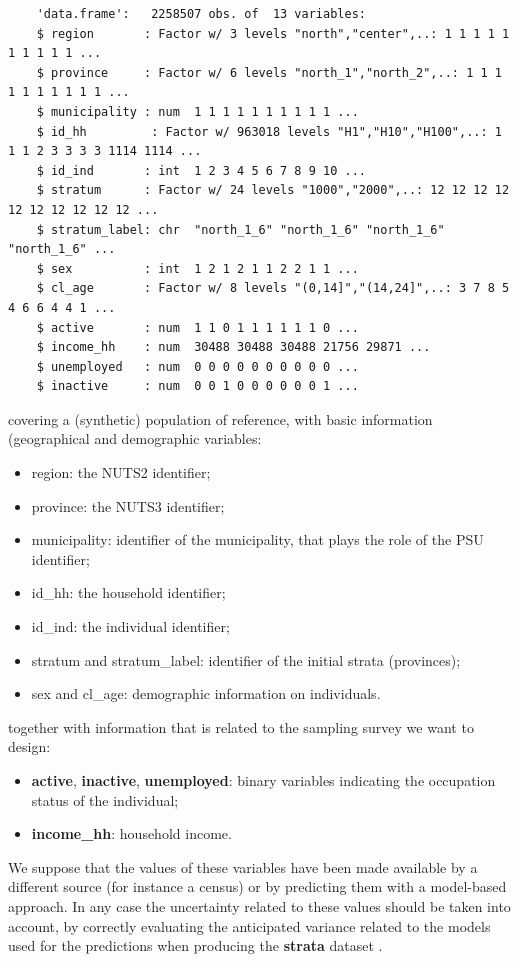 \begin{verbatim}
	'data.frame':   2258507 obs. of  13 variables:
	$ region       : Factor w/ 3 levels "north","center",..: 1 1 1 1 1 1 1 1 1 1 ...
	$ province     : Factor w/ 6 levels "north_1","north_2",..: 1 1 1 1 1 1 1 1 1 1 ...
	$ municipality : num  1 1 1 1 1 1 1 1 1 1 ...
	$ id_hh         : Factor w/ 963018 levels "H1","H10","H100",..: 1 1 1 2 3 3 3 3 1114 1114 ...
	$ id_ind       : int  1 2 3 4 5 6 7 8 9 10 ...
	$ stratum      : Factor w/ 24 levels "1000","2000",..: 12 12 12 12 12 12 12 12 12 12 ...
	$ stratum_label: chr  "north_1_6" "north_1_6" "north_1_6" "north_1_6" ...
	$ sex          : int  1 2 1 2 1 1 2 2 1 1 ...
	$ cl_age       : Factor w/ 8 levels "(0,14]","(14,24]",..: 3 7 8 5 4 6 6 4 4 1 ...
	$ active       : num  1 1 0 1 1 1 1 1 1 0 ...
	$ income_hh    : num  30488 30488 30488 21756 29871 ...
	$ unemployed   : num  0 0 0 0 0 0 0 0 0 0 ...
	$ inactive     : num  0 0 1 0 0 0 0 0 0 1 ...
\end{verbatim}	
covering a (synthetic) population of reference, with basic information (geographical and demographic variables: 
\begin{itemize}
	\item region: the NUTS2 identifier;
	\item province: the NUTS3 identifier;
	\item municipality: identifier of the municipality, that plays the role of the PSU identifier;
	\item id\_hh: the household identifier;
	\item id\_ind: the individual identifier;
	\item stratum and stratum\_label: identifier of the initial strata (provinces);
	\item sex and cl\_age: demographic information on individuals.
\end{itemize}
together with information that is related to the sampling survey we want to design:
\begin{itemize}
	\item \textbf{active}, \textbf{inactive}, \textbf{unemployed}: binary variables indicating the occupation status of the individual; 
	\item \textbf{income\_hh}: household income.
\end{itemize}
We suppose that the values of these variables have been made available by a different source (for instance a census) or by predicting them with a model-based approach. In any case the uncertainty related to these values should be taken into account, by correctly evaluating the anticipated variance related to the models used for the predictions when producing the \textbf{strata} dataset \citep[][p. 59]{Baillargeon+Rivest:2012}.

